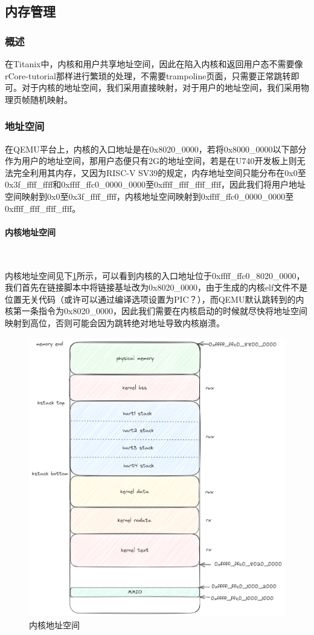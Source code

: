 \subsection{内存管理}

\subsubsection{概述}

在Titanix中，内核和用户共享地址空间，因此在陷入内核和返回用户态不需要像rCore-tutorial那样进行繁琐的处理，不需要trampoline页面，只需要正常跳转即可。对于内核的地址空间，我们采用直接映射，对于用户的地址空间，我们采用物理页帧随机映射。

\subsubsection{地址空间}

在QEMU平台上，内核的入口地址是在0x8020\_0000，若将0x8000\_0000以下部分作为用户的地址空间，那用户态便只有2G的地址空间，若是在U740开发板上则无法完全利用其内存，又因为RISC-V SV39的规定，内存地址空间只能分布在0x0至0x3f\_ffff\_ffff和0xffff\_ffc0\_0000\_0000至0xffff\_ffff\_ffff\_ffff，因此我们将用户地址空间映射到0x0至0x3f\_ffff\_ffff，内核地址空间映射到0xffff\_ffc0\_0000\_0000至0xffff\_ffff\_ffff\_ffff。\\

\paragraph{内核地址空间}~{}

内核地址空间见下\cref{pic:kernel_mem}所示，可以看到内核的入口地址位于0xffff\_ffc0\_8020\_0000，我们首先在链接脚本中将链接基址改为0x8020\_0000，由于生成的内核elf文件不是位置无关代码（或许可以通过编译选项设置为PIC？），而QEMU默认跳转到的内核第一条指令为0x8020\_0000，因此我们需要在内核启动的时候就尽快将地址空间映射到高位，否则可能会因为跳转绝对地址导致内核崩溃。
\begin{figure}[hbt]
    \centering
    \includegraphics[width=.8\linewidth]{figure/kernel_mem.png}
    \caption{内核地址空间}
    \label{pic:kernel_mem}
\end{figure}


